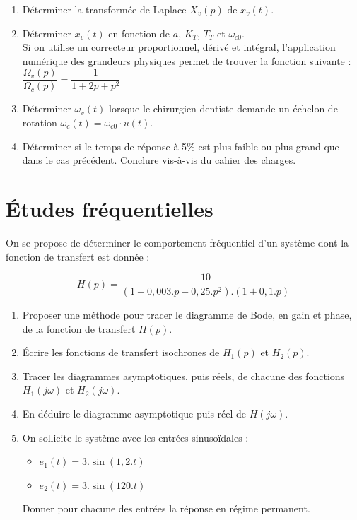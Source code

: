 \begin{enumerate}
\item Déterminer la transformée de Laplace $X_v(p)$ de $x_v(t)$.

\item Déterminer $x_v(t)$ en fonction de $a$, $K_T$, $T_T$ et $\omega_{c0}$.\\


Si on utilise un correcteur proportionnel, dérivé et intégral, l'application numérique des grandeurs physiques permet de trouver la fonction suivante : $\dfrac{\Omega_v(p)}{\Omega_c(p)} = \dfrac{1}{1+2p+p^2}
$

\item Déterminer $\omega_v(t)$ lorsque le chirurgien dentiste demande un échelon de rotation $\omega_c(t)=\omega_{c0}\cdot u(t)$.

\item Déterminer si le temps de réponse à 5\% est plus faible  ou plus grand que dans le cas précédent. Conclure vis-à-vis du cahier des charges.
\end{enumerate}
\newpage

\section{Études fréquentielles}


On se propose de d\'eterminer le comportement fr\'equentiel d'un syst\`eme dont la fonction de transfert est donn\'ee :
\begin{description}
\item \[H(p)=\frac{10}{(1+0,003.p+0,25.p^2).(1+0,1.p)}\]
\end{description}
\begin{enumerate}
\item Proposer une m\'ethode pour tracer le diagramme de Bode, en gain et phase, de la fonction de transfert $H(p)$.
\item \'Ecrire les fonctions de transfert isochrones de $H_1(p)$ et $H_2(p)$.
\item Tracer les diagrammes asymptotiques, puis r\'eels, de chacune des fonctions $H_1(j\omega)$ et $H_2(j\omega)$.
\item En d\'eduire le diagramme asymptotique puis réel de $H(j\omega)$.
\item On sollicite le syst\`eme avec les entr\'ees sinuso\"idales :
\begin{itemize}
\item $e_1(t)=3.\sin(1,2.t)$
\item $e_2(t)=3.\sin(120.t)$
\end{itemize}
Donner pour chacune des entr\'ees la r\'eponse en r\'egime permanent.
\end{enumerate}

